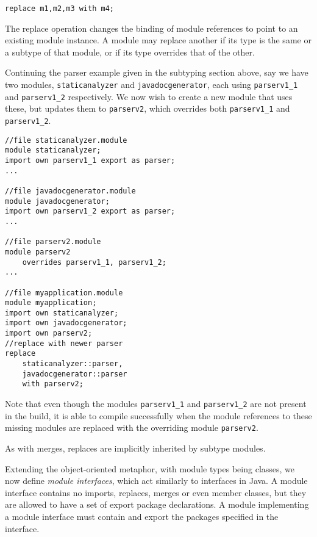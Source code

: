 \begin{lstlisting}
replace m1,m2,m3 with m4;
\end{lstlisting}

The replace operation
changes the binding of module references to point to an existing
module instance. A module may replace another if its type is the same or a subtype
of that module, or if its type overrides that of the other.

Continuing the parser example given in the subtyping section above, say we have two 
modules, {\tt staticanalyzer} and {\tt javadocgenerator}, each using {\tt parserv1\_1}
and {\tt parserv1\_2} respectively. We now wish to create a new module that uses these, 
but updates them to {\tt parserv2}, which overrides both {\tt parserv1\_1} and {\tt parserv1\_2}.

\begin{lstlisting}[caption=Module Replace]
//file staticanalyzer.module
module staticanalyzer;
import own parserv1_1 export as parser;
...

//file javadocgenerator.module
module javadocgenerator;
import own parserv1_2 export as parser;
...

//file parserv2.module
module parserv2 
	overrides parserv1_1, parserv1_2;
...

//file myapplication.module
module myapplication;
import own staticanalyzer;
import own javadocgenerator;
import own parserv2;
//replace with newer parser
replace 
	staticanalyzer::parser,
	javadocgenerator::parser
	with parserv2;
\end{lstlisting}

Note that even though the modules {\tt parserv1\_1} and {\tt parserv1\_2}
are not present in the build, it is able to compile successfully when the
module references to these missing modules are replaced with the overriding
module {\tt parserv2}.

As with merges, replaces are implicitly inherited by subtype modules.



Extending the object-oriented metaphor, with module types being classes, we 
now define \textit{module interfaces}, which act similarly to interfaces in Java. A module
interface contains no imports, replaces, merges or even member classes, but they
are allowed to have a set of export package declarations. A module implementing
a module interface must contain and export the packages specified in the interface.

